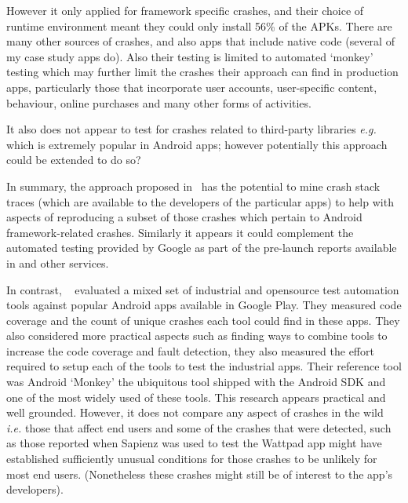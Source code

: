 However it only applied for framework specific crashes, and their choice of runtime environment meant they could only install 56\% of the APKs. There are many other sources of crashes, and also apps that include native code (several of my case study apps do). Also their testing is limited to automated `monkey' testing which may further limit the crashes their approach can find in production apps, particularly those that incorporate user accounts, user-specific content, behaviour, online purchases and many other forms of activities.

It also does not appear to test for crashes related to third-party libraries \emph{e.g.}  which is extremely popular in Android apps; however potentially this approach could be extended to do so?

\afterpage{\clearpage}

In summary, the approach proposed in~ has the potential to mine crash stack traces (which are available to the developers of the particular apps) to help with aspects of reproducing a subset of those crashes which pertain to Android framework-related crashes. Similarly it appears it could complement the automated testing provided by Google as part of the pre-launch reports available in  and other services. 

In contrast, ~ evaluated a mixed set of industrial and opensource test automation tools against popular Android apps available in Google Play. They measured code coverage and the count of unique crashes each tool could find in these apps. They also considered more practical aspects such as finding ways to combine tools to increase the code coverage and fault detection, they also measured the effort required to setup each of the tools to test the industrial apps. Their reference tool was Android `Monkey' the ubiquitous tool shipped with the Android SDK and one of the most widely used of these tools. This research appears practical and well grounded. However, it does not compare any aspect of crashes in the wild \emph{i.e.} those that affect end users and some of the crashes that were detected, such as those reported when Sapienz was used to test the Wattpad app might have established sufficiently unusual conditions for those crashes to be unlikely for most end users. (Nonetheless these crashes might still be of interest to the app's developers). 

